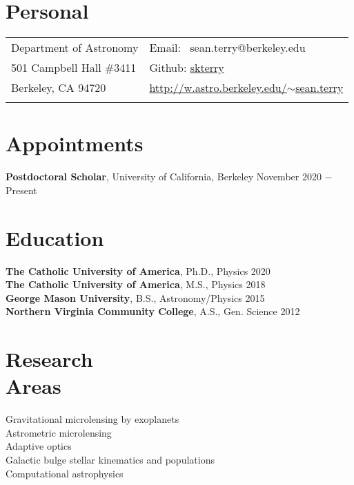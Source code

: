 \documentclass[margin,line]{res}
\begin{document}

\begin{resume}
\section{\sc Personal}

\vspace{.05in}
\begin{tabular}{@{}p{3.5in}p{3in}}
Department of Astronomy      & Email: \,\,\,sean.terry@berkeley.edu \\
501 Campbell Hall \#3411       &  Github: \hyperlink{https://github.com/skterry}{skterry} \\
Berkeley, CA 94720       & \hyperlink{http://w.astro.berkeley.edu/~sean.terry}{http://w.astro.berkeley.edu/$\sim$sean.terry}\\
 \\
\end{tabular}

\section{\sc Appointments}
{\bf Postdoctoral Scholar}, University of California, Berkeley  \hfill      {November 2020 $-$ Present}\\


\section{\sc Education}
{\bf The Catholic University of America}, Ph.D., Physics  \hfill 2020\\
{\bf The Catholic University of America}, M.S., Physics  \hfill 2018\\
{\bf George Mason University}, B.S., Astronomy/Physics \hfill 2015\\
{\bf Northern Virginia Community College}, A.S., Gen. Science \hfill 2012\\

\section{\sc Research\\ Areas}
Gravitational microlensing by exoplanets  \\
Astrometric microlensing \\
Adaptive optics \\
Galactic bulge stellar kinematics and populations  \\
Computational astrophysics \\



\end{resume}
\end{document}
